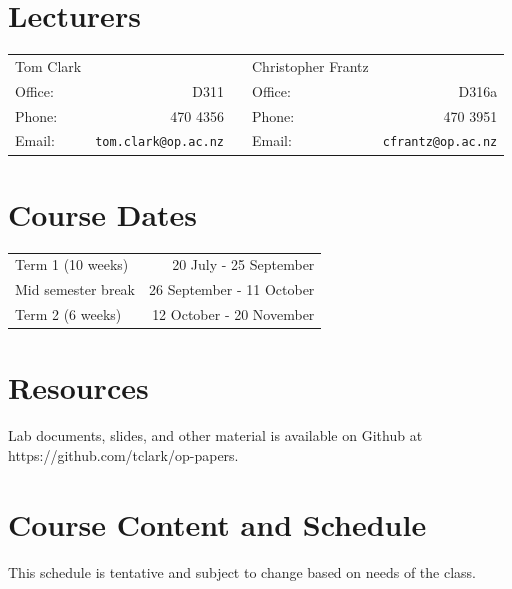 \documentclass{article}
\begin{document}
\section*{Lecturers}
\begin{tabular}[width=7cm]{l r p{4cm} l r}

  Tom Clark & & & Christopher Frantz & \\
     Office: & D311 & & Office: & D316a \\
     Phone: & 470 4356 & & Phone: & 470 3951 \\
     Email: & \texttt{tom.clark@op.ac.nz} & & Email: & \texttt{cfrantz@op.ac.nz} \\
\end{tabular}

\section*{Course Dates}
\begin{tabular}{lr}
Term 1 (10 weeks) & 20 July - 25 September \\
Mid semester break & 26 September - 11 October \\
Term 2 (6 weeks) & 12 October - 20 November \\
\end{tabular}


\section*{Resources}

Lab documents, slides, and other material is available on Github at https://github.com/tclark/op-papers.

\newpage 

\section*{Course Content and Schedule}
This schedule is tentative and subject to change based on needs of the class.
\end{document}
